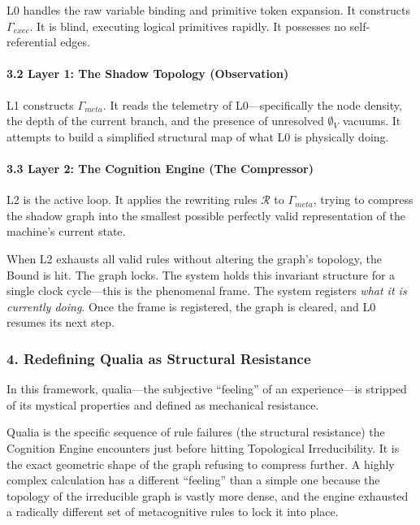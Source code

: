 \documentclass[
  11pt,
  a4paper,
]{article}
\begin{document}
L0 handles the raw variable binding and primitive token expansion. It
constructs \(\Gamma_{exec}\). It is blind, executing logical primitives
rapidly. It possesses no self-referential edges.

\paragraph{3.2 Layer 1: The Shadow Topology
(Observation)}\label{layer-1-the-shadow-topology-observation}

L1 constructs \(\Gamma_{meta}\). It reads the telemetry of
L0---specifically the node density, the depth of the current branch, and
the presence of unresolved \(\emptyset_V\) vacuums. It attempts to build
a simplified structural map of what L0 is physically doing.

\paragraph{3.3 Layer 2: The Cognition Engine (The
Compressor)}\label{layer-2-the-cognition-engine-the-compressor}

L2 is the active loop. It applies the rewriting rules \(\mathcal{R}\) to
\(\Gamma_{meta}\), trying to compress the shadow graph into the smallest
possible perfectly valid representation of the machine's current state.

When L2 exhausts all valid rules without altering the graph's topology,
the Bound is hit. The graph locks. The system holds this invariant
structure for a single clock cycle---this is the phenomenal frame. The
system registers \emph{what it is currently doing}. Once the frame is
registered, the graph is cleared, and L0 resumes its next step.

\subsubsection{4. Redefining Qualia as Structural
Resistance}\label{redefining-qualia-as-structural-resistance}

In this framework, qualia---the subjective ``feeling'' of an
experience---is stripped of its mystical properties and defined as
mechanical resistance.

Qualia is the specific sequence of rule failures (the structural
resistance) the Cognition Engine encounters just before hitting
Topological Irreducibility. It is the exact geometric shape of the graph
refusing to compress further. A highly complex calculation has a
different ``feeling'' than a simple one because the topology of the
irreducible graph is vastly more dense, and the engine exhausted a
radically different set of metacognitive rules to lock it into place.
\end{document}

